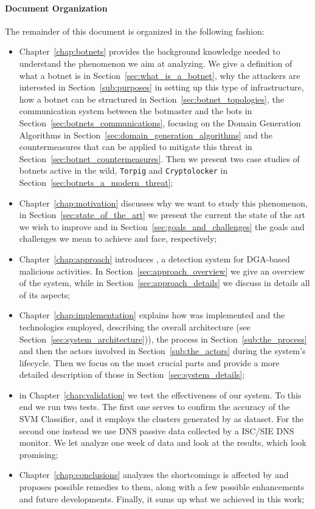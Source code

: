 \paragraph{Document Organization}
The remainder of this document is organized in the following fashion:
\begin{itemize}
    \item Chapter~\ref{chap:botnets} provides the background knowledge
        needed to understand the phenomenon we aim at analyzing. We give
        a definition of what a botnet is in Section~\ref{sec:what_is_a_botnet}, why the attackers are interested in Section~\ref{sub:purposes} in setting up this type of infrastructure, how a botnet can be structured in Section~\ref{sec:botnet_topologies},
        the communication system between the botmaster and the bots in Section~\ref{sec:botnets_communications}, focusing on the Domain Generation Algorithms in Section~\ref{sec:domain_generation_algorithms} and the countermeasures that can be applied
        to mitigate this threat in Section~\ref{sec:botnet_countermeasures}. Then we
        present two case studies of botnets active in the wild, \texttt{Torpig}
        and \texttt{Cryptolocker} in Section~\ref{sec:botnets_a_modern_threat};
    \item Chapter~\ref{chap:motivation} discusses why we want to study
        this phenomenon, in Section~\ref{sec:state_of_the_art} we present
        the current the state of the art we wish to improve and
        in Section~\ref{sec:goals_and_challenges} the goals and challenges
        we mean to achieve and face, respectively;
    \item Chapter~\ref{chap:approach} introduces \thesystem, a
        detection system for DGA-based malicious activities. In Section~\ref{sec:approach_overview} we  give an overview of the system, while in
        Section~\ref{sec:approach_details} we  discuss in details all of
        its aspects;
    \item Chapter~\ref{chap:implementation} explains how \thesystem
        was implemented and the technologies employed, describing the overall
        architecture (see Section~\ref{sec:system_architecture})), the process in Section~\ref{sub:the_process} and then the actors involved in Section~\ref{sub:the_actors}
        during the system's lifecycle. Then we focus on the most crucial
        parts and provide a more detailed description of those in Section~\ref{sec:system_details};
    \item in Chapter~\ref{chap:validation} we test the effectiveness of our system.
        To this end we run two tests. The first one serves to confirm the
        accuracy of the SVM Classifier, and it employs the clusters generated
        by \phoenix as dataset. For the second one instead we use DNS passive
        data collected by a ISC/SIE DNS monitor. We let \thesystem analyze one
        week of data and look at the results, which look promising;
    \item Chapter~\ref{chap:conclusions} analyzes the shortcomings
        \thesystem is affected by and proposes possible remedies to them, along with a few possible enhancements and future developments. Finally,
        it sums up what we achieved in this work;
\end{itemize}
